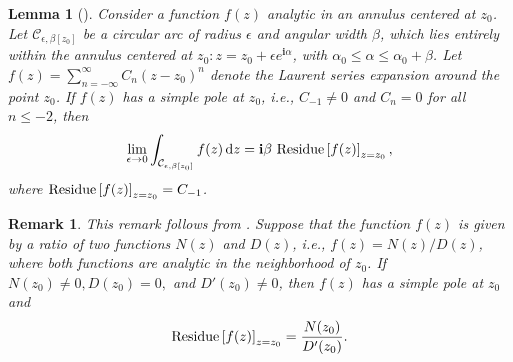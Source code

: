 \documentclass[journal,twoside,web]{ieeecolor}
\newtheorem{lemma}{Lemma}
\newtheorem{remark}{Remark}
\newcommand{\C}{\mathcal{C}}
\newcommand{\im}{\mathbf{i}}
\newcommand*\diff{\mathop{}\!\mathrm{d}}
\begin{document}
\begin{lemma}[]
	\label{lemm:skip-pole}
		Consider a function $f(z)$ analytic in an annulus centered at $z_0$. Let $\C_{\epsilon,\beta[z_0]}$ be a circular arc of radius $\epsilon$ and angular width $\beta$, which lies entirely within the annulus centered at $z_0: z=z_0+\epsilon e^{\im \alpha}$, with $\alpha_0\leq\alpha\leq\alpha_0+\beta$. 
		Let $f(z)=\sum_{n=-\infty}^{\infty}C_n(z-z_0)^n$ denote the Laurent series expansion around the point $z_0$.
		If $f(z)$ has a simple pole at $z_0$, i.e., $C_{-1}\neq0$ and $C_{n}=0$ for all $n\leq-2$, then
			\begin{equation*}
				\lim_{\epsilon\to0}\int_{\C_{\epsilon,\beta[z_0]}} f(z)\diff z=\im\beta\ \text{\normalfont Residue}\left[f(z)\right]_{z=z_0},
			\end{equation*}
			where $\text{\normalfont Residue}\left[f(z)\right]_{z=z_0} =C_{-1}$.
\end{lemma}
\begin{remark}\label{re:skip-pole}
	This remark follows from \cite[eq. 4.1.10]{ablowitz2003complex}.
	Suppose that the function $f(z)$ is given by a ratio of two functions $N(z)$ and $D(z)$,  i.e., $f(z) = N(z)/D(z)$, where both functions are analytic in the neighborhood of $z_0$.
	If $N(z_0)\neq0, D(z_0)=0,$ and $D'(z_0)\neq0$, then  $f(z)$ has a simple pole at $z_0$ and
	$$ \text{\normalfont Residue}\left[f(z)\right]_{z=z_0} =\frac{N(z_0)}{D'(z_0)} .$$

\end{remark}
 
\end{document}
